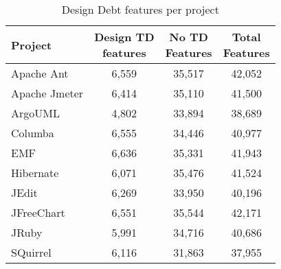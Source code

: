 \begin{table}[!hbt]
    \begin{center}
        \caption{Design Debt features per project}
        \label{tbl:design_features_per_project}
        \begin{tabular}{l| c c c }
        \toprule
        \textbf{Project} & \thead{Design TD\\features} & \thead{No TD\\Features} & \thead{Total\\Features} \\
        \midrule
        Apache Ant    &  6,559 & 35,517 & 42,052  \\
        Apache Jmeter &  6,414 & 35,110 & 41,500  \\
        ArgoUML       &  4,802 & 33,894 & 38,689  \\
        Columba       &  6,555 & 34,446 & 40,977  \\
        EMF           &  6,636 & 35,331 & 41,943  \\
        Hibernate     &  6,071 & 35,476 & 41,524  \\
        JEdit         &  6,269 & 33,950 & 40,196  \\
        JFreeChart    &  6,551 & 35,544 & 42,171  \\
        JRuby         &  5,991 & 34,716 & 40,686  \\
        SQuirrel      &  6,116 & 31,863 & 37,955  \\
        \bottomrule
        \end{tabular}
    \end{center}    
\end{table}


